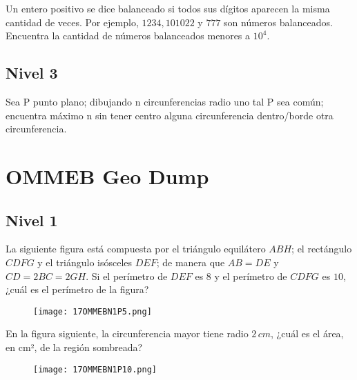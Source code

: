 \begin{problem}[OMMEB 2017]
    Un entero positivo se dice balanceado si todos sus dígitos 
    aparecen la misma cantidad de veces. Por ejemplo,
    \(1234, 101022\) y \(777\) son números balanceados. 
    Encuentra la cantidad de números balanceados menores a 
    \(10^4\).
\end{problem}

\section{Nivel 3}

\begin{problem}[OMMEB 2017]
    Sea P punto plano; dibujando n circunferencias radio uno tal P 
    sea común; encuentra máximo n sin tener centro alguna 
    circunferencia dentro/borde otra circunferencia.
\end{problem}

\chapter{OMMEB Geo Dump}

\section{Nivel 1}

\begin{problem}[OMMEB 2017]
    La siguiente figura está compuesta por el triángulo 
    equilátero \(ABH\); el rectángulo \(CDFG\) y el triángulo 
    isósceles \(DEF\); de manera que \(AB = DE\) y 
    \(CD = 2BC = 2GH\). Si el perímetro de \(DEF\) es \(8\) y 
    el perímetro de \(CDFG\) es \(10\), 
    ¿cuál es el perímetro de la figura?
\end{problem}

\begin{figure}[h]
    \centering
    \texttt{[image: 17OMMEBN1P5.png]}
\end{figure}

\begin{problem}[OMMEB 2017]
    En la figura siguiente, la circunferencia mayor tiene radio 
    \(2\, cm\), ¿cuál es el área, en cm², de la región sombreada?
\end{problem}

\begin{figure}[h]
    \centering
    \texttt{[image: 17OMMEBN1P10.png]}
\end{figure}

